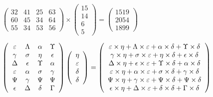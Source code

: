 \documentclass[12pt]{article}
\begin{document}
 
 
\noindent{}
 
 

 
$\left( \begin{array}{ccccccccccccccc}
          32  & 
          41  & 
          25  & 
          63  \\ 
          60  & 
          45  & 
          34  & 
          64  \\ 
          55  & 
          34  & 
          53  & 
          56
\end{array}\right) \times
\left( \begin{array}{c}
          15  \\ 
          14  \\ 
           6  \\ 
           5
\end{array}\right)  =
\left( \begin{array}{c}
        1519  \\ 
        2054  \\ 
        1899
\end{array}\right)  $
 
$  %
 \left( \begin{array}
 {
 c
 c
 c
 c
 }
 \varepsilon & 
 \Lambda & 
 \alpha & 
 \Upsilon \\ 
 \gamma & 
 \sigma & 
 \eta & 
 \epsilon \\ 
 \Delta & 
 \epsilon & 
 \Upsilon & 
 \alpha \\ 
 \varepsilon & 
 \alpha & 
 \sigma & 
 \gamma \\ 
 \Psi & 
 \gamma & 
 \Psi & 
 \Psi \\ 
 \epsilon & 
 \Delta & 
 \delta & 
 \Gamma
 \end{array} \right)
 \left( \begin{array}
 {
 c
 }
 \eta \\ 
 \varepsilon \\ 
 \delta \\ 
 \delta
 \end{array} \right)
=
 \left( \begin{array}
 {
 c
 }
  \varepsilon \times  \eta +  \Lambda \times  \varepsilon +  \alpha \times  \delta +  \Upsilon \times  \delta \\ 
  \gamma \times  \eta +  \sigma \times  \varepsilon +  \eta \times  \delta +  \epsilon \times  \delta \\ 
  \Delta \times  \eta +  \epsilon \times  \varepsilon +  \Upsilon \times  \delta +  \alpha \times  \delta \\ 
  \varepsilon \times  \eta +  \alpha \times  \varepsilon +  \sigma \times  \delta +  \gamma \times  \delta \\ 
  \Psi \times  \eta +  \gamma \times  \varepsilon +  \Psi \times  \delta +  \Psi \times  \delta \\ 
  \epsilon \times  \eta +  \Delta \times  \varepsilon +  \delta \times  \delta +  \Gamma \times  \delta
 \end{array} \right)
$
 
\end{document}
